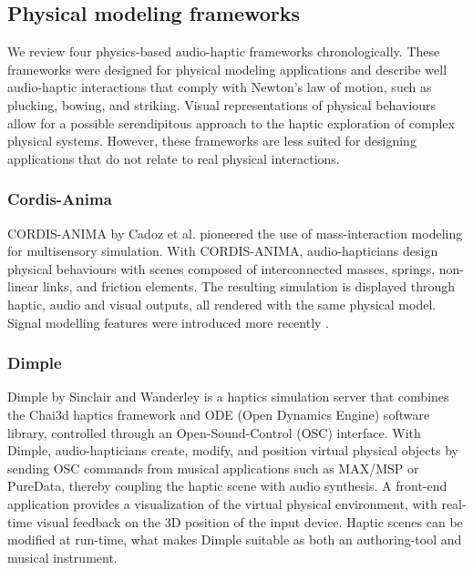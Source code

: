 \documentclass[sigconf]{nimeart}
\begin{document}
\subsection{Physical modeling frameworks}\label{physical-modeling-frameworks}

We review four physics-based audio-haptic frameworks chronologically. These frameworks were designed for physical modeling applications and describe well audio-haptic interactions that comply with Newton's law of motion, such as plucking, bowing, and striking. Visual representations of physical behaviours allow for a possible serendipitous approach to the haptic exploration of complex physical systems. However, these frameworks are less suited for designing applications that do not relate to real physical interactions.

\subsubsection{Cordis-Anima}\label{cordis-anima}

CORDIS-ANIMA by Cadoz et al. \cite{Cadoz1993CORDIS} pioneered the use of mass-interaction modeling for multisensory simulation. With CORDIS-ANIMA, audio-hapticians design physical behaviours with scenes composed of interconnected masses, springs, non-linear links, and friction elements. The resulting simulation is displayed through haptic, audio and visual outputs, all rendered with the same physical model. Signal modelling features were introduced more recently \cite{Villeneuve2015Visual}.

\subsubsection{Dimple}\label{dimple}

Dimple by Sinclair and Wanderley \cite{Sinclair2009run} is a haptics simulation server that combines the Chai3d haptics framework and ODE (Open Dynamics Engine) software library, controlled through an Open-Sound-Control (OSC) interface. With Dimple, audio-hapticians create, modify, and position virtual physical objects by sending OSC commands from musical applications such as MAX/MSP or PureData, thereby coupling the haptic scene with audio synthesis. A front-end application provides a visualization of the virtual physical environment, with real-time visual feedback on the 3D position of the input device. Haptic scenes can be modified at run-time, what makes Dimple suitable as both an authoring-tool and musical instrument.
\end{document}
